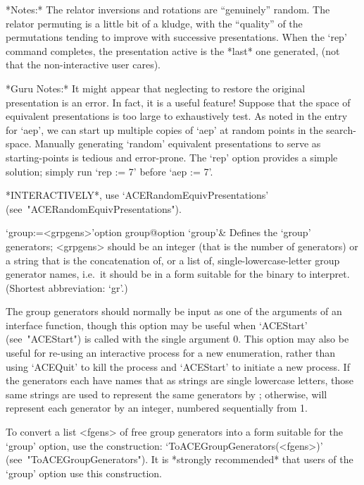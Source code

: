 *Notes:*
The relator inversions and rotations  are  ``genuinely''  random.  The
relator permuting is a little bit of a kludge, with the ``quality'' of
the permutations tending to  improve  with  successive  presentations.
When the `rep' command  completes,  the  presentation  active  is  the
*last* one generated, (not that the non-interactive user cares).

*Guru Notes:*
It might appear that neglecting to restore the  original  presentation
is an error. In fact, it is a useful feature! Suppose that  the  space
of equivalent presentations is too  large  to  exhaustively  test.  As
noted in the entry for `aep', we can start up multiple copies of `aep'
at random points in the  search-space.  Manually  generating  `random'
equivalent presentations to serve as starting-points  is  tedious  and
error-prone. The `rep' option provides a simple solution;  simply  run
`rep := 7' before `aep := 7'.

*INTERACTIVELY*,           use           `ACERandomEquivPresentations'
(see~"ACERandomEquivPresentations").

\enditems


\beginitems

\>`group:=<grpgens>'{option group}@{option `group'}&
Defines the `group' generators; <grpgens> should be an  integer  (that
is the number of generators) or a string that is the concatenation of,
or a list of, single-lowercase-letter group generator  names,  i.e.~it
should be in a form suitable  for  the  {\ACE}  binary  to  interpret.
(Shortest abbreviation: `gr'.)

The group generators should normally be input as one of the  arguments
of an {\ACE} interface function, though this option may be useful when
`ACEStart' (see~"ACEStart") is called with the single argument 0. This
option may also be useful for re-using an interactive  process  for  a
new enumeration, rather than using `ACEQuit' to kill the  process  and
`ACEStart' to initiate a new process.  If  the  generators  each  have
names that as strings are single lowercase letters, those same strings
are used to represent the same generators by {\ACE}; otherwise, {\ACE}
will represent each generator by  an  integer,  numbered  sequentially
from 1.

To convert a {\GAP} list <fgens> of free group generators into a  form
suitable   for   the   `group'   option,   use    the    construction:
`ToACEGroupGenerators(<fgens>)'  (see~"ToACEGroupGenerators").  It  is
*strongly recommended* that users  of  the  `group'  option  use  this
construction.

